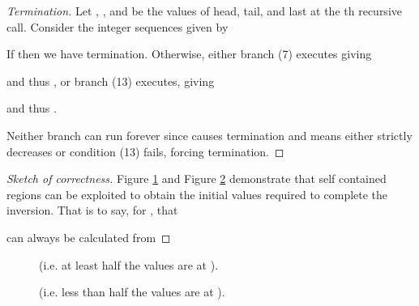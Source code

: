 \documentclass[12pt]{article}
\theoremstyle{definition}
\newcommand{\0}{\mathbf{0}}
\theoremstyle{theorem}
\theoremstyle{definition}
\begin{document}
\begin{proof}[Termination]
Let , , and  be the values of head, tail, and last at the th recursive call. Consider the {integer} sequences given by


If  then we have termination. Otherwise, either branch (7) executes giving

and thus , or branch (13) executes, giving

and thus .

Neither branch can run forever since  causes termination and  means either  strictly decreases or condition (13) fails, forcing termination.
\end{proof}

\begin{proof}[Sketch of correctness]
Figure \ref{MoreHalf} and Figure \ref{LessHalf} demonstrate that self contained regions can be exploited to obtain the  initial values required to complete the inversion. That is to say, for , that

can always be calculated from

\end{proof}

{\center
\begin{figure}[p]
\caption{ (i.e. at least half the values are at ).}
\label{MoreHalf}
\end{figure}
}

{\center
\begin{figure}[p]
\begin{center}
\label{LessHalf}
\end{center}
\caption{ (i.e. less than half the values are at ).}
\end{figure}
}
\end{document}

